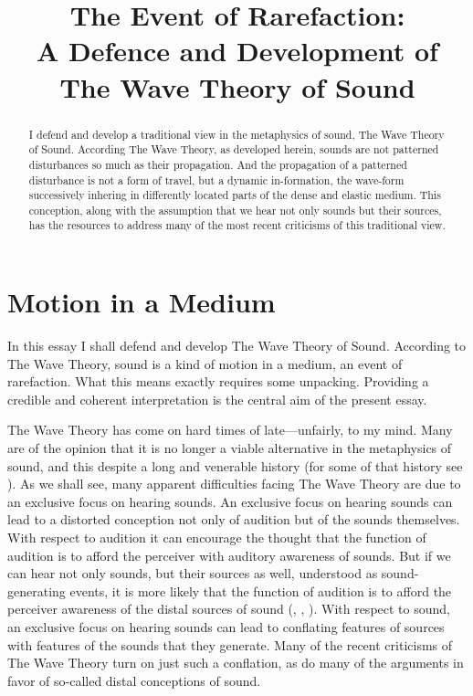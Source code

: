 \documentclass[12pt]{article}
\title{The Event of Rarefaction:\\A Defence and Development of The Wave Theory of Sound}
\author{\myauthor}
\date{} %
\begin{document}
\maketitle
\begin{abstract} %
\noindent I defend and develop a traditional view in the metaphysics of sound, The Wave Theory of Sound. According The Wave Theory, as developed herein, sounds are not patterned disturbances so much as their propagation. And the propagation of a patterned disturbance is not a form of travel, but a dynamic in-formation, the wave-form successively inhering in differently located parts of the dense and elastic medium. This conception, along with the assumption that we hear not only sounds but their sources, has the resources to address many of the most recent criticisms of this traditional view.
\end{abstract}

\setlength{\parindent}{1em}


\section{Motion in a Medium} %
\label{sec:motion_in_a_medium}

In this essay I shall defend and develop The Wave Theory of Sound. According to The Wave Theory, sound is a kind of motion in a medium, an event of rarefaction. What this means exactly requires some unpacking. Providing a credible and coherent interpretation is the central aim of the present essay. 

The Wave Theory has come on hard times of late---unfairly, to my mind. Many are of the opinion that it is no longer a viable alternative in the metaphysics of sound, and this despite a long and venerable history (for some of that history see \citealt{Pasnau:2000aa}). As we shall see, many apparent difficulties facing The Wave Theory are due to an exclusive focus on hearing sounds. An exclusive focus on hearing sounds can lead to a distorted conception not only of audition but of the sounds themselves. With respect to audition it can encourage the thought that the function of audition is to afford the perceiver with auditory awareness of sounds. But if we can hear not only sounds, but their sources as well, understood as sound-generating events, it is more likely that the function of audition is to afford the perceiver awareness of the distal sources of sound (\citealt{Nudds:2009sf}, \citealt{Leddington:2014aa}, \citealt[chapter 4]{Kalderon:2018oe}). With respect to sound, an exclusive focus on hearing sounds can lead to conflating features of sources with features of the sounds that they generate. Many of the recent criticisms of The Wave Theory turn on just such a conflation, as do many of the arguments in favor of so-called distal conceptions of sound.
\end{document}
